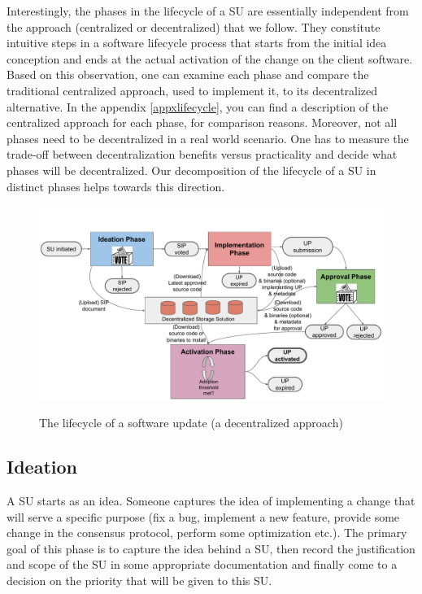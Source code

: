 Interestingly, the phases in the lifecycle of a SU are essentially independent from the approach (centralized or decentralized) that we follow. They constitute intuitive steps in a software lifecycle process that starts from the initial idea conception and ends at the actual activation of the change on the client software. Based on this observation, one can examine each phase and compare the traditional centralized approach, used to implement it, to its decentralized alternative. In the appendix
\ref{appxlifecycle}, you can find a description of the centralized approach for each phase, for comparison reasons. Moreover, not all phases need to be decentralized in a real world scenario. One has to measure the trade-off between decentralization benefits versus practicality and decide what phases will be decentralized. Our decomposition of the lifecycle of a SU in distinct phases helps towards this direction.

\begin{figure}[h!] %
    \caption{The lifecycle of a software update (a decentralized approach)}
    \centering
    \includegraphics[width=1.0 \columnwidth,keepaspectratio]{figures/lifecycle_phases.pdf}
    \label{lifecycle}
\end{figure}

\subsection{Ideation}
A SU starts as an idea. Someone captures the idea of implementing a change that will serve a specific purpose (fix a bug, implement a new feature, provide some change in the consensus protocol, perform some optimization etc.). The primary goal of this phase is to capture the idea behind a SU, then record the justification and scope of the SU in some appropriate documentation and finally come to a decision on the priority that will be given to this SU. 

